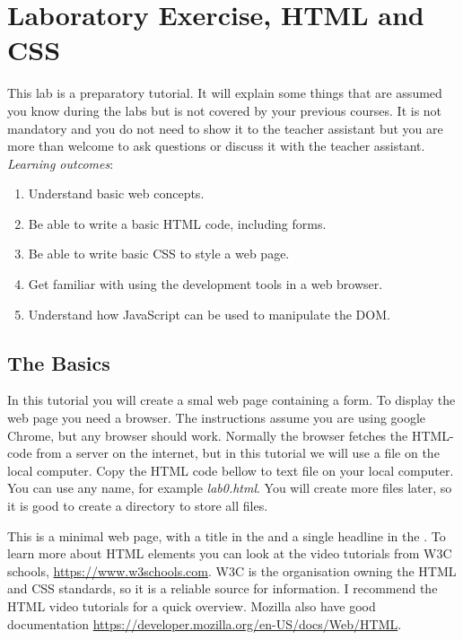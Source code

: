 \documentclass[fleqn, article, a4paper]{memoir}
\begin{document}
\maketitle
\thispagestyle{titlepage}
\vspace{-4cm}

\section*{Laboratory Exercise, HTML and CSS}
\n This lab is a preparatory tutorial. It will explain some things that are assumed you know during the labs but is not covered by your previous courses. It is not mandatory and you do not need to show it to the teacher assistant but you are more than welcome to ask questions or discuss it with the teacher assistant. \emph{Learning outcomes}:
\begin{enumerate}\firmlist 
\item Understand basic web concepts.
\item Be able to write a basic HTML code, including forms.
\item Be able to write basic CSS to style a web page.
\item Get familiar with using the development tools in a web browser.
\item Understand how JavaScript can be used to manipulate the DOM.
\end{enumerate}

\subsection*{The Basics}
In this tutorial you will create a smal web page containing a form. To display the web page you need a browser. The instructions assume you are using google Chrome, but any browser should work. Normally the browser fetches the HTML-code from a server on the internet, but in this tutorial we will use a file on the local computer. Copy the HTML code bellow to text file on your local computer. You can use any name, for example \emph{lab0.html}. You will create more files later, so it is good to create a directory to store all files.

This is a minimal web page, with a title in the  and a single headline in the . To learn more about HTML elements you can look at the video tutorials from W3C schools, \url{https://www.w3schools.com}. W3C is the organisation owning the HTML and CSS standards, so it is a reliable source for information. I recommend the HTML video tutorials for a quick overview. Mozilla also have good documentation \url{https://developer.mozilla.org/en-US/docs/Web/HTML}.
\end{document}
